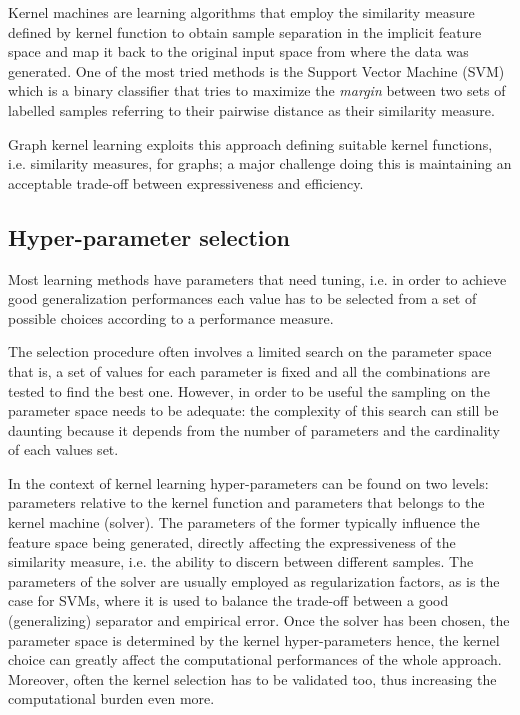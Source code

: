 Kernel machines are learning algorithms that employ the similarity measure defined
by kernel function to obtain sample separation in the implicit feature space and
map it back to the original input space from where the data was generated.
One of the most tried methods is the Support Vector Machine (SVM) \cite{Cortes&Vapnik:1995}
which is a binary classifier that tries to maximize the \emph{margin} between
two sets of labelled samples referring to their pairwise distance as their
similarity measure.

Graph kernel learning exploits this approach defining suitable kernel functions,
i.e. similarity measures, for graphs; a major challenge doing this is maintaining
an acceptable trade-off between expressiveness and efficiency.

\subsection{Hyper-parameter selection}
\label{sec:why}

Most learning methods have parameters that need tuning, i.e. in order to achieve
good generalization performances each value has to be selected from a set of
possible choices according to a performance measure.

The selection procedure often involves a limited search on the parameter space
that is, a set of values for each parameter is fixed and all the combinations
are tested to find the best one.
However, in order to be useful the sampling on the parameter space needs to be adequate:
the complexity of this search can still be daunting because it depends from the
number of parameters and the cardinality of each values set.

In the context of kernel learning hyper-parameters can be found on two levels:
parameters relative to the kernel function and parameters that belongs to the
kernel machine (solver).
The parameters of the former typically influence the feature space being generated,
directly affecting the expressiveness of the similarity measure, i.e. the ability
to discern between different samples.
The parameters of the solver are usually employed as regularization factors,
as is the case for SVMs, where it is used to balance the trade-off between a good
(generalizing) separator and empirical error.
Once the solver has been chosen, the parameter space is determined by the kernel
hyper-parameters hence, the kernel choice can greatly affect the computational
performances of the whole approach.
Moreover, often the kernel selection has to be validated too, thus increasing the
computational burden even more.

